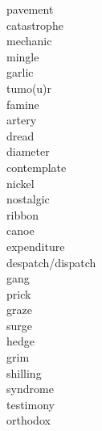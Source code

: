 \documentclass[a4paper, 11pt]{ctexart}
\begin{document}
\begin{multicols*}{3}
\begin{description}
\item[pavement]

\item[catastrophe]

\item[mechanic]

\item[mingle]

\item[garlic]

\item[tumo(u)r]

\item[famine]

\item[artery]

\item[dread]

\item[diameter]

\item[contemplate]

\item[nickel]

\item[nostalgic]

\item[ribbon]

\item[canoe]

\item[expenditure]

\item[despatch/dispatch]

\item[gang]

\item[prick]

\item[graze]

\item[surge]

\item[hedge]

\item[grim]

\item[shilling]

\item[syndrome]

\item[testimony]

\item[orthodox]


\end{description}
\end{multicols*}
\end{document}
